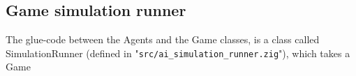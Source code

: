 \subsection{Game simulation runner}
The glue-code between the Agents and the Game classes, is a class called SimulationRunner (defined in "{\tt src/ai\_simulation\_runner.zig}"), which takes a Game
